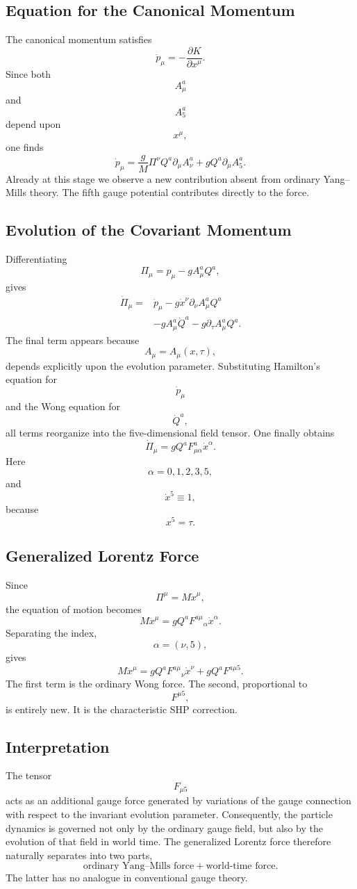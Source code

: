 \subsection{Equation for the Canonical Momentum}
The canonical momentum satisfies
\[\dot p_\mu=-\frac{\partial K}{\partial x^\mu}.\]
Since both
\[A_\mu^a\]
and
\[A_5^a\]
depend upon
\[x^\mu,\]
one finds
\[\boxed{\dot p_\mu=\frac{g}{M}\Pi^\nu Q^a\partial_\mu A_\nu^a
+gQ^a\partial_\mu A_5^a.}\]
Already at this stage we observe a new contribution absent from ordinary
Yang--Mills theory.
The fifth gauge potential contributes directly to the force.
\subsection{Evolution of the Covariant Momentum}
Differentiating
\[\Pi_\mu=p_\mu-gA_\mu^aQ^a,\]
gives
\[\begin{aligned}
\dot\Pi_\mu=&\dot p_\mu-g\dot x^\nu\partial_\nu A_\mu^aQ^a\\
&-gA_\mu^a\dot Q^a-g\partial_\tau A_\mu^aQ^a.
\end{aligned}\]
The final term appears because
\[A_\mu=A_\mu(x,\tau),
\]
depends explicitly upon the evolution parameter.
Substituting
Hamilton's equation for
\[\dot p_\mu\]
and the Wong equation for
\[\dot Q^a,\]
all terms reorganize into the five-dimensional field tensor.
One finally obtains
\[\boxed{\dot\Pi_\mu=gQ^aF_{\mu\alpha}^a\dot x^\alpha.}\]
Here
\[\alpha=0,1,2,3,5,\]
and
\[\dot x^5\equiv 1,\]
because
\[x^5=\tau.\]
\subsection{Generalized Lorentz Force}
Since
\[\Pi^\mu=M\dot x^\mu,\]
the equation of motion becomes
\[\boxed{M\ddot x^\mu=gQ^aF^{a\mu}{}_{\alpha}\dot x^\alpha.}\]
Separating the index,
\[\alpha=(\nu,5),\]
gives
\[\boxed{M\ddot x^\mu=gQ^aF^{a\mu}{}_{\nu}\dot x^\nu+gQ^aF^{a\mu5}.}\]
The first term is the ordinary Wong force.
The second,
proportional to
\[F^{\mu5},\]
is entirely new.
It is the characteristic SHP correction.
\subsection{Interpretation}
The tensor
\[F_{\mu5}\]
acts as an additional gauge force generated by variations of the gauge
connection with respect to the invariant evolution parameter.
Consequently,
the particle dynamics is governed not only by the ordinary gauge field,
but also by the evolution of that field in world time.
The generalized Lorentz force therefore naturally separates into two
parts,
\[\boxed{\text{ordinary Yang--Mills force}+\text{world-time force}.}\]
The latter has no analogue in conventional gauge theory.
